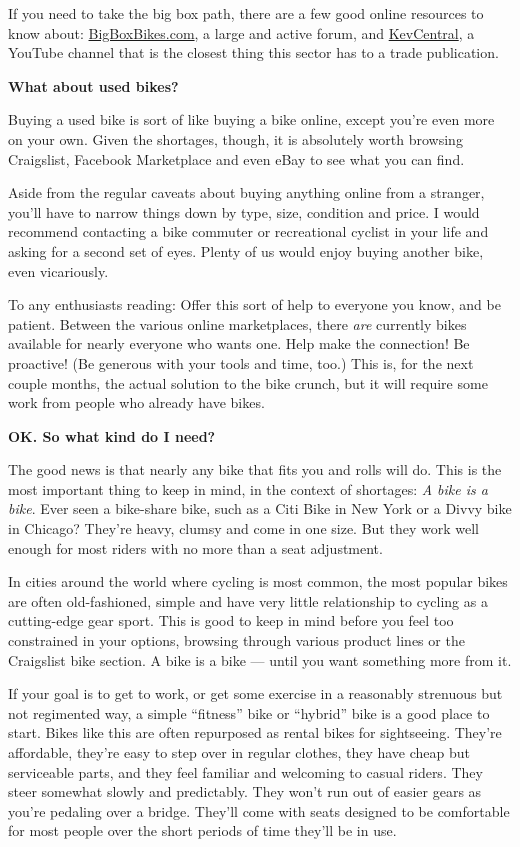 If you need to take the big box path, there are a few good online
resources to know about:
\href{http://bigboxbikes.com/}{BigBoxBikes.com}, a large and active
forum, and
\href{https://www.youtube.com/channel/UC_mxl2kDiu-Ls_m7dR5qjtw}{KevCentral},
a YouTube channel that is the closest thing this sector has to a trade
publication.

\textbf{What about used bikes?}

Buying a used bike is sort of like buying a bike online, except you're
even more on your own. Given the shortages, though, it is absolutely
worth browsing Craigslist, Facebook Marketplace and even eBay to see
what you can find.

Aside from the regular caveats about buying anything online from a
stranger, you'll have to narrow things down by type, size, condition and
price. I would recommend contacting a bike commuter or recreational
cyclist in your life and asking for a second set of eyes. Plenty of us
would enjoy buying another bike, even vicariously.

To any enthusiasts reading: Offer this sort of help to everyone you
know, and be patient. Between the various online marketplaces, there
\emph{are} currently bikes available for nearly everyone who wants one.
Help make the connection! Be proactive! (Be generous with your tools and
time, too.) This is, for the next couple months, the actual solution to
the bike crunch, but it will require some work from people who already
have bikes.

\textbf{OK. So what kind do I need?}

The good news is that nearly any bike that fits you and rolls will do.
This is the most important thing to keep in mind, in the context of
shortages: \emph{A bike is a bike}. Ever seen a bike-share bike, such as
a Citi Bike in New York or a Divvy bike in Chicago? They're heavy,
clumsy and come in one size. But they work well enough for most riders
with no more than a seat adjustment.

In cities around the world where cycling is most common, the most
popular bikes are often old-fashioned, simple and have very little
relationship to cycling as a cutting-edge gear sport. This is good to
keep in mind before you feel too constrained in your options, browsing
through various product lines or the Craigslist bike section. A bike is
a bike --- until you want something more from it.

If your goal is to get to work, or get some exercise in a reasonably
strenuous but not regimented way, a simple ``fitness'' bike or
``hybrid'' bike is a good place to start. Bikes like this are often
repurposed as rental bikes for sightseeing. They're affordable, they're
easy to step over in regular clothes, they have cheap but serviceable
parts, and they feel familiar and welcoming to casual riders. They steer
somewhat slowly and predictably. They won't run out of easier gears as
you're pedaling over a bridge. They'll come with seats designed to be
comfortable for most people over the short periods of time they'll be in
use.

